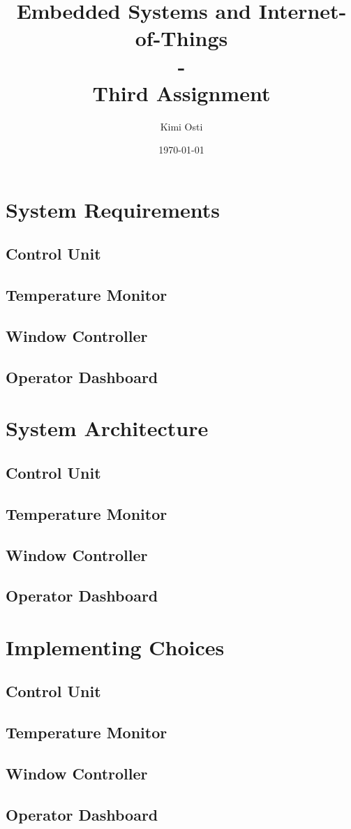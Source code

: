 \documentclass[a4paper,12pt]{report}
\title{Embedded Systems and Internet-of-Things \\ - \\ Third Assignment}
\author{Kimi Osti}
\date{\today}
\begin{document}
	
	\maketitle
	\tableofcontents
	
	\chapter{System Requirements}
	\section{Control Unit}
	\section{Temperature Monitor}
	\section{Window Controller}
	\section{Operator Dashboard}
	
	\chapter{System Architecture}
	\section{Control Unit}
	\section{Temperature Monitor}
	\section{Window Controller}
	\section{Operator Dashboard}
	
	\chapter{Implementing Choices}
	\section{Control Unit}
	\section{Temperature Monitor}
	\section{Window Controller}
	\section{Operator Dashboard}
	
\end{document}
